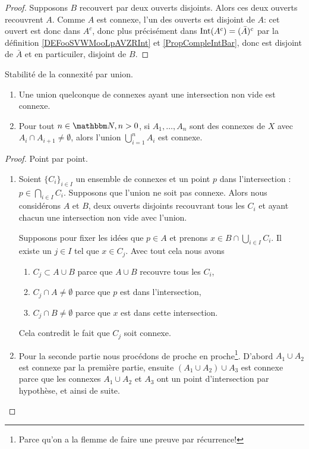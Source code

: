 \begin{proof}
  Supposons \( B \) recouvert par deux ouverts disjoints. Alors ces deux ouverts recouvrent \(A \). Comme \( A \) est connexe, l'un des ouverts est disjoint de \(A \): cet ouvert est donc dans \( A^c \), donc plus précisément dans \( \operatorname{Int}(A^c) = (\bar A)^c \) par la définition \ref{DEFooSVWMooLpAVZRInt} et \eqref{PropCompleIntBar}, donc est disjoint de \( \bar A \) et en particuiler, disjoint de \(B \).
\end{proof}

\begin{proposition} \label{PropIWIDzzH}
    Stabilité de la connexité par union.
    \begin{enumerate}
        \item
    Une union quelconque de connexes ayant une intersection non vide est connexe.
\item
    Pour tout \( n \in \eN, n > 0 \), si \( A_1,\ldots, A_n\) sont des connexes de \( X\) avec \( A_i\cap A_{i+1}\neq \emptyset\), alors l'union \( \bigcup_{i=1}^nA_i\) est connexe.
    \end{enumerate}
\end{proposition}

\begin{proof}
    Point par point.
    \begin{enumerate}
        \item
    Soient \( \{ C_i \}_{i\in I}\) un ensemble de connexes et un point \( p\) dans l'intersection : \( p\in\bigcap_{i\in I}C_i\). Supposons que l'union ne soit pas connexe. Alors nous considérons \( A\) et \( B\), deux ouverts disjoints recouvrant tous les \( C_i\) et ayant chacun une intersection non vide avec l'union.

    Supposons pour fixer les idées que \( p\in A\) et prenons \( x\in B\cap\bigcup_{i\in I}C_i\). Il existe un \( j\in I\) tel que \( x\in C_j\). Avec tout cela nous avons
    \begin{enumerate}
        \item
            \( C_j\subset A\cup B\) parce que \(A \cup B\) recouvre tous les \( C_i \),
        \item
            \( C_j\cap A\neq \emptyset\) parce que \( p\) est dans l'intersection,
        \item
            \( C_j\cap B\neq\emptyset\) parce que \( x\) est dans cette intersection.
    \end{enumerate}
    Cela contredit le fait que \( C_j\) soit connexe.

\item

    Pour la seconde partie nous procédons de proche en proche\footnote{Parce qu'on a la flemme de faire une preuve par récurrence!}. D'abord \( A_1\cup A_2\) est connexe par la première partie, ensuite \( (A_1\cup A_2)\cup A_3\) est connexe parce que les connexes \( A_1\cup A_2\) et \( A_3\) ont un point d'intersection par hypothèse, et ainsi de suite.
    \end{enumerate}
\end{proof}

